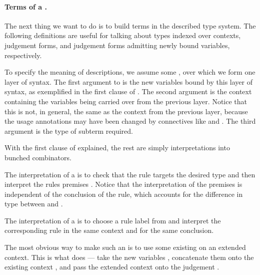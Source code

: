 
\paragraph{Terms of a .}

The next thing we want to do is to build terms in the described type system.
The following definitions are useful for talking about types indexed over
contexts, judgement forms, and judgement forms admitting newly bound variables,
respectively.


To specify the meaning of descriptions, we assume some
, over which we form one layer of syntax.
The first argument to  is the new variables bound by this layer
of syntax, as exemplified in the first clause of
.
The second argument is the context containing the variables being carried over
from the previous layer.
Notice that this is not, in general, the same as the context from the previous
layer, because the usage annotations may have been changed by connectives like
 and .
The third argument is the type of subterm required.

With the first clause of  explained,
the rest are simply interpretations into bunched combinators.


The interpretation of a  is to check that the rule targets
the desired type and then interpret the rules premises .
Notice that the interpretation of the premises is independent of the conclusion
of the rule, which accounts for the difference in type between
 and
.


The interpretation of a  is to choose a rule label
 from  and interpret the corresponding rule
\AgdaSpace{} in the same context and for the same
conclusion.


The most obvious way to make such an  is to use some existing
 on an extended context.
This is what  does --- take the new variables
\AgdaBound{$\Delta$}, concatenate them onto the existing context
\AgdaBound{$\Gamma$}, and pass the extended context onto the judgement
.

